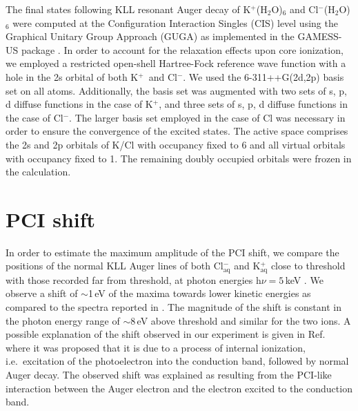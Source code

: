 \documentclass[journal=jpclcd,manuscript=letter]{achemso}
\begin{document}
The final states following KLL resonant Auger decay of K$^{+}$(H$_2$O)$_6$ and Cl$^{-}$(H$_2$O)$_6$ were computed at the Configuration Interaction Singles (CIS) level using the Graphical Unitary Group Approach (GUGA) as implemented in the GAMESS-US package \citep{GUGA_PhysScr_21,GUGA_JCP_70,GUS}. In order to account for the relaxation effects upon core ionization, we employed a restricted open-shell Hartree-Fock reference wave function with a hole in the 2s orbital of both K$^{+}$~and Cl$^{-}$.  We used the 6-311++G(2d,2p) basis set \citep{Krishnan80:650,McLean80:5639,Blaudeau97:5016} on all atoms. Additionally, the basis set was augmented with two sets of s, p, d diffuse functions in the case of K$^{+}$, and three sets of s, p, d diffuse functions in the case of Cl$^{-}$. The larger basis set employed in the case of Cl was necessary in order to ensure the convergence of the excited states. The active space comprises the 2s and 2p orbitals of K/Cl with occupancy fixed to 6 and all virtual orbitals with occupancy fixed to 1. The remaining doubly occupied orbitals were frozen in the calculation. \citep{mosnier16:061401}

\section{PCI shift}
In order to estimate the maximum amplitude of the PCI shift, we compare the positions of the normal KLL Auger lines of both Cl$^{-}_{\text{aq}}$ and K$^{+}_{\text{aq}}$ close to threshold with those recorded far from threshold, at photon energies h$\nu = 5$\,keV \citep{ceolin17:263003}. We observe a shift of $\sim$1\,eV of the maxima towards lower kinetic energies as compared to the spectra reported in \citep{ceolin17:263003}. The magnitude of the shift is constant in the photon energy range of $\sim$8\,eV above threshold and similar for the two ions. A possible explanation of the shift observed in our experiment is given in Ref.\ \cite{tchaplyguine07:124314} where it was proposed that it is due to a process of internal ionization, i.e.\ excitation of the photoelectron into the conduction band, followed by normal Auger decay. The observed shift was explained as resulting from the PCI-like interaction between the Auger electron and the electron excited to the conduction band.
\end{document}
